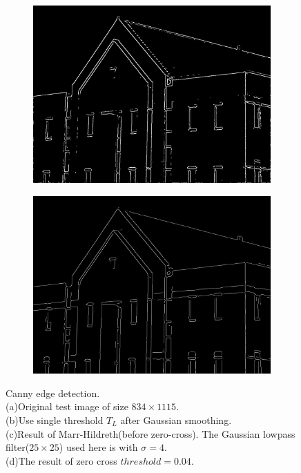 \begin{figure}[h!]
\begin{subfigure}[b]{0.45\linewidth}
    	\caption{}
    	\label{fig:thresholdonly}
  	\end{subfigure}
  	\begin{subfigure}[b]{0.45\linewidth}
		\includegraphics[width=\linewidth]{myfigure/p9/9_zerocross_12.png}
		\caption{}
		\label{fig:zerocross_12_}
	\end{subfigure}
	\begin{subfigure}[b]{0.45\linewidth}
		\includegraphics[width=\linewidth]{myfigure/p9/9_canny.png}
		\caption{}
		\label{fig:canny}
	\end{subfigure}
	
	\caption{Canny edge detection. \\(a)Original test image of size $834 \times 1115$.\\ (b)Use single threshold $T_L$ after Gaussian smoothing. \\(c)Result of Marr-Hildreth(before zero-cross). The Gaussian lowpass filter($25\times 25$) used here is with $\sigma=4$.\\ (d)The result of zero cross $threshold=0.04$.}
  	\label{fig:eval_canny}
\end{figure}

